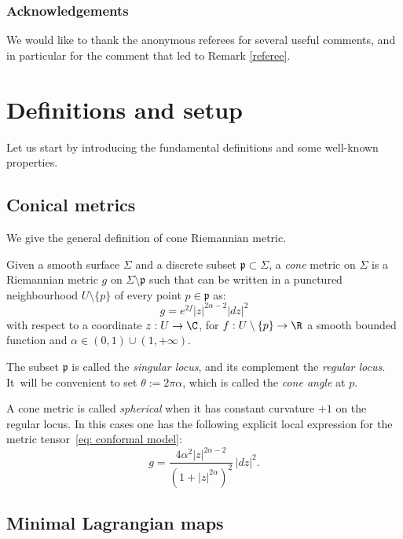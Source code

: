 \subsubsection*{Acknowledgements}
We would like to thank the anonymous referees for several useful comments, and in particular for the comment that led to Remark \ref{referee}.

\section{Definitions and setup}

Let us start by introducing the fundamental definitions and some well-known properties.

\subsection{Conical metrics}
We give the general definition of cone Riemannian metric.

\begin{defi} \label{defi cone sing}
Given a smooth surface $\Sigma$ and a discrete subset $\mathfrak p\subset \Sigma$, a \emph{cone} metric on $\Sigma$ is a Riemannian metric $g$ on $\Sigma\setminus \mathfrak p$ such that can be written in a punctured neighbourhood $U\setminus\{p\}$ of every point $p\in \mathfrak p$ as:
\begin{equation} \label{eq: conformal model}
g=e^{2f}|z|^{2\alpha-2}|dz|^2
\end{equation}
with respect to a coordinate $z:U\to\C$, for $f:U\setminus \{p\}\to\R$ a smooth bounded function and $\alpha\in (0,1)\cup (1,+\infty)$.
\end{defi}

The subset $\mathfrak p$ is called the \emph{singular locus}, and its complement the \emph{regular locus}. It~will be convenient to set $\theta:=2\pi\alpha$, which is called the \emph{cone angle} at $p$.

A cone metric is called \emph{spherical} when it has constant curvature $+1$ on the regular locus. In this cases one has the following explicit local expression for the metric tensor~\eqref{eq: conformal model}:
\begin{equation}\label{eq:spherical cone metric}
g=\frac{4\alpha^2|z|^{2\alpha-2}}{(1+|z|^{2\alpha})^2}\,|dz|^2.
\end{equation}

\subsection{Minimal Lagrangian maps}

